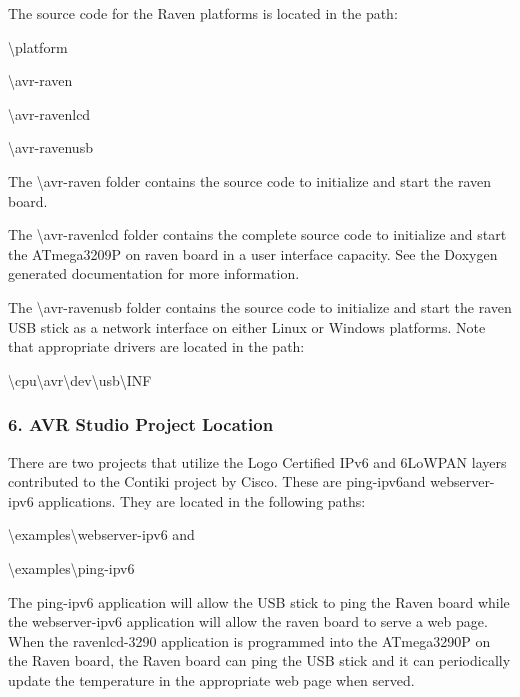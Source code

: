 The source code for the Raven platforms is located in the path\+:
\begin{DoxyItemize}
\item \textbackslash{}platform
\begin{DoxyItemize}
\item \textbackslash{}avr-\/raven
\item \textbackslash{}avr-\/ravenlcd
\item \textbackslash{}avr-\/ravenusb
\end{DoxyItemize}
\end{DoxyItemize}
\begin{DoxyEnumerate}
\item The \textbackslash{}avr-\/raven folder contains the source code to initialize and start the raven board.
\item The \textbackslash{}avr-\/ravenlcd folder contains the complete source code to initialize and start the A\+Tmega3209P on raven board in a user interface capacity. See the Doxygen generated documentation for more information.
\item The \textbackslash{}avr-\/ravenusb folder contains the source code to initialize and start the raven U\+SB stick as a network interface on either Linux or Windows platforms. Note that appropriate drivers are located in the path\+:
\begin{DoxyItemize}
\item \textbackslash{}cpu\textbackslash{}avr\textbackslash{}dev\textbackslash{}usb\textbackslash{}I\+NF
\end{DoxyItemize}
\end{DoxyEnumerate}\hypertarget{a00069_macavrstudio}{}\subsubsection{6. A\+V\+R Studio Project Location}\label{a00069_macavrstudio}
There are two projects that utilize the Logo Certified I\+Pv6 and 6\+Lo\+W\+P\+AN layers contributed to the Contiki project by Cisco. These are ping-\/ipv6and webserver-\/ipv6 applications. They are located in the following paths\+:
\begin{DoxyItemize}
\item \textbackslash{}examples\textbackslash{}webserver-\/ipv6 and
\item \textbackslash{}examples\textbackslash{}ping-\/ipv6
\end{DoxyItemize}

The ping-\/ipv6 application will allow the U\+SB stick to ping the Raven board while the webserver-\/ipv6 application will allow the raven board to serve a web page. When the ravenlcd-\/3290 application is programmed into the A\+Tmega3290P on the Raven board, the Raven board can ping the U\+SB stick and it can periodically update the temperature in the appropriate web page when served. 
